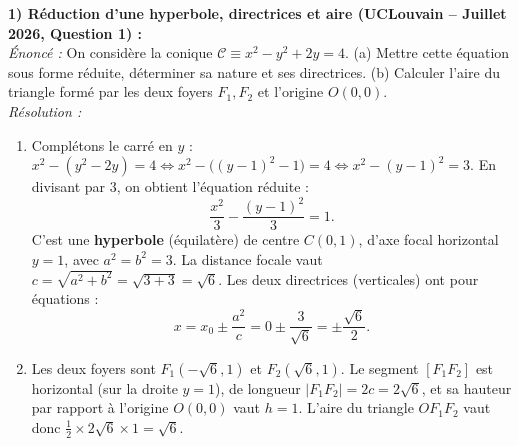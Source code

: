 \begin{exemple}
\textbf{1) Réduction d'une hyperbole, directrices et aire (UCLouvain -- Juillet 2026, Question 1) :}\\
\emph{Énoncé :} On considère la conique $\mathcal{C} \equiv x^2 - y^2 + 2y = 4$. (a) Mettre cette équation sous forme réduite, déterminer sa nature et ses directrices. (b) Calculer l'aire du triangle formé par les deux foyers $F_1, F_2$ et l'origine $O(0,0)$.\\
\emph{Résolution :}
\begin{enumerate}[label=(\alph*)]
    \item Complétons le carré en $y$ : $x^2 - (y^2 - 2y) = 4 \iff x^2 - \bigl((y-1)^2 - 1\bigr) = 4 \iff x^2 - (y-1)^2 = 3$. En divisant par $3$, on obtient l'équation réduite :
    \[
        \boxed{\frac{x^2}{3} - \frac{(y-1)^2}{3} = 1}.
    \]
    C'est une \textbf{hyperbole} (équilatère) de centre $C(0, 1)$, d'axe focal horizontal $y = 1$, avec $a^2 = b^2 = 3$. La distance focale vaut $c = \sqrt{a^2 + b^2} = \sqrt{3 + 3} = \sqrt{6}$. Les deux directrices (verticales) ont pour équations :
    \[
        x = x_0 \pm \frac{a^2}{c} = 0 \pm \frac{3}{\sqrt{6}} = \boxed{\pm \frac{\sqrt{6}}{2}}.
    \]
    \item Les deux foyers sont $F_1(-\sqrt{6}, 1)$ et $F_2(\sqrt{6}, 1)$. Le segment $[F_1 F_2]$ est horizontal (sur la droite $y = 1$), de longueur $|F_1 F_2| = 2c = 2\sqrt{6}$, et sa hauteur par rapport à l'origine $O(0,0)$ vaut $h = 1$. L'aire du triangle $O F_1 F_2$ vaut donc $\frac{1}{2} \times 2\sqrt{6} \times 1 = \boxed{\sqrt{6}}$.
\end{enumerate}


\end{exemple}
